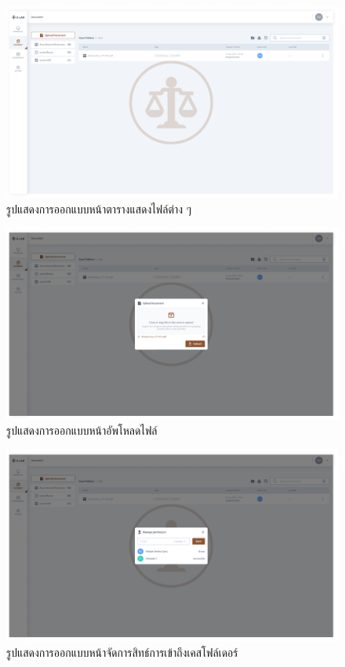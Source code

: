 \documentclass[12pt,oneside,openright,a4paper]{cpe-thai-project}
\begin{document}
\begin{figure}[!h]\centering
  \includegraphics[width=13cm]{./assets/userinterface/document-list.png}
  \caption{รูปแสดงการออกแบบหน้าตารางแสดงไฟล์ต่าง ๆ}\label{fig:document-list}
\end{figure}

\begin{figure}[!h]\centering
  \includegraphics[width=13cm]{./assets/userinterface/upload-document.png}
  \caption{รูปแสดงการออกแบบหน้าอัพโหลดไฟล์}\label{fig:upload-document}
\end{figure}
\clearpage

\begin{figure}[!h]\centering
  \includegraphics[width=13cm]{./assets/userinterface/folder-permission.png}
  \caption{รูปแสดงการออกแบบหน้าจัดการสิทธ์การเข้าถึงเคสโฟล์เดอร์}\label{fig:folder-permission}
\end{figure}
\end{document}
